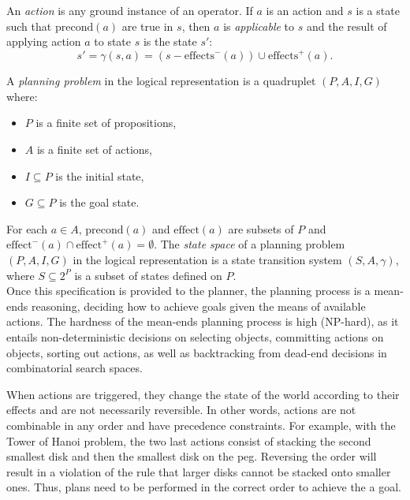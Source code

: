 \begin{definition}
	An \textit{action} is any ground instance of an operator. If $a$ is an action and $s$ is a state such that $\text{precond}(a)$ are true in $s$, then $a$ is {\em applicable} to $s$ and the result of applying action $a$ to state $s$ is the state $s'$:  
	\[s' = \gamma(s, a) = (s - \text{effects}^{-}(a)) \cup \text{effects}^{+}(a).\]
\end{definition}


\begin{definition}
A \textit{planning problem} in the logical representation is a quadruplet $(P, A, I, G)$ where:
\begin{itemize}
	\item $P$ is a finite set of propositions,
	\item $A$ is a finite set of actions,
	\item $I \subseteq P$ is the initial state,
	\item $G \subseteq P$ is the goal state.
\end{itemize}
\end{definition}


For each $a \in A$, $\text{precond}(a)$ and $\text{effect}(a)$ are subsets of $P$ and $\text{effect}^{-}(a) \cap \text{effect}^{+}(a) = \emptyset$. The {\em state space} of a planning problem $(P, A, I, G)$ in the logical representation is a state transition system $(S, A, \gamma)$, where $S\subseteq 2^{P}$ is a subset of states defined on $P$.\\

Once this specification is provided to the planner, the planning process is a mean-ends reasoning, deciding how to achieve goals given the means of available actions. The hardness of the mean-ends planning process is high (NP-hard), as it entails non-deterministic decisions on selecting objects, committing actions on objects, sorting out actions, as well as backtracking from dead-end decisions in combinatorial search spaces.

When actions are triggered, they change the state of the world according to their effects and are not necessarily reversible. In other words, actions are not combinable in any order and have precedence constraints. For example, with the Tower of Hanoi problem, the two last actions consist of stacking the second smallest disk and then the smallest disk on the peg. Reversing the order will result in a violation of the rule that larger disks cannot be stacked onto smaller ones. Thus, plans need to be performed in the correct order to achieve the a goal.

